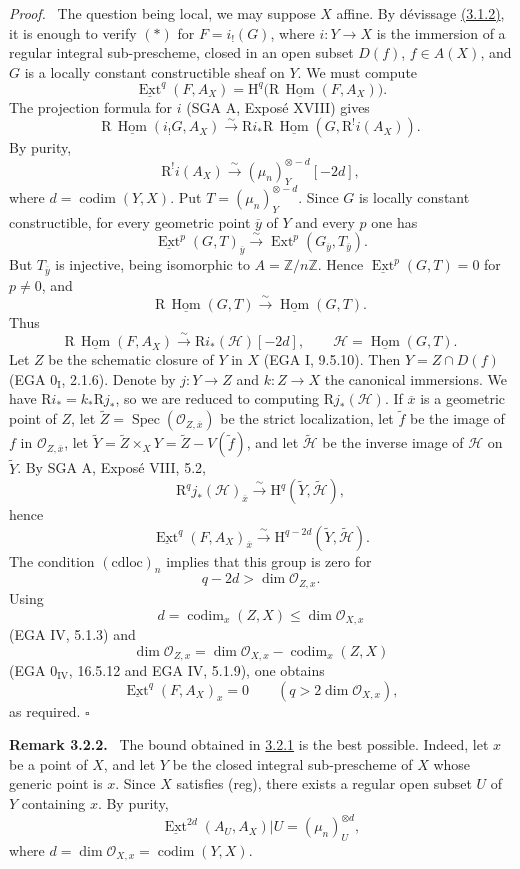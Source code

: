 \documentclass[11pt]{article}
\DeclareMathOperator{\codim}{codim}
\providecommand{\cO}{\mathcal{O}}
\providecommand{\wt}[1]{\widetilde{#1}}
\providecommand{\Hh}{\mathrm{H}}
\providecommand{\uExt}{\underline{\Ext}}
\providecommand{\qedtext}{\hfill$\square$}
\providecommand{\ZZ}{\mathbb{Z}}
\newenvironment{statement}[1]{\par\medskip\noindent\textbf{#1.}\ }{\par\medskip}
\newenvironment{prooftext}[1][Proof]{\par\noindent\emph{#1.}\ }{\par\medskip}
\DeclareMathOperator{\Hom}{Hom}
\DeclareMathOperator{\Ext}{Ext}
\DeclareMathOperator{\Spec}{Spec}
\newcommand{\R}{\mathrm{R}}
\newcommand{\ol}[1]{\overline{#1}}
\providecommand{\Hom}{\operatorname{Hom}}
\providecommand{\R}{\mathrm R}
\providecommand{\Spec}{\operatorname{Spec}}
\providecommand{\Spec}{\operatorname{Spec}}
\providecommand{\Hom}{\operatorname{Hom}}
\providecommand{\Spec}{\operatorname{Spec}}
\providecommand{\qedtext}{\hfill$\square$}
\providecommand{\Spec}{\operatorname{Spec}}
\begin{document}
\begin{prooftext}
The question being local, we may suppose $X$ affine. By dévissage \hyperref[sga5:I:statement:3.1.2]{(3.1.2)}, it is enough to verify $(*)$ for $F=i_!(G)$, where $i:Y\to X$ is the immersion of a regular integral sub-prescheme, closed in an open subset $D(f)$, $f\in A(X)$, and $G$ is a locally constant constructible sheaf on $Y$. We must compute
\[
   \uExt^q(F,A_X)=\Hh^q\bigl(\R\,\underline{\Hom}(F,A_X)\bigr).
\]
The projection formula for $i$ (SGA A, Exposé XVIII) gives
\[
 \R\,\underline{\Hom}(i_!G,A_X)
   \xrightarrow{\sim}
 \R i_*\R\,\underline{\Hom}(G,\R^!i(A_X)).
\]
By purity,
\[
   \R^!i(A_X)\xrightarrow{\sim}(\mu_n)^{\otimes -d}_Y[-2d],
\]
where $d=\codim(Y,X)$. Put $T=(\mu_n)^{\otimes -d}_Y$. Since $G$ is locally constant constructible, for every geometric point $\ol y$ of $Y$ and every $p$ one has
\[
   \uExt^p(G,T)_{\ol y}\xrightarrow{\sim}\Ext^p(G_{\ol y},T_{\ol y}).
\]
But $T_{\ol y}$ is injective, being isomorphic to $A=\ZZ/n\ZZ$. Hence $\uExt^p(G,T)=0$ for $p\ne0$, and
\[
   \R\,\underline{\Hom}(G,T)\xrightarrow{\sim}\underline{\Hom}(G,T).
\]
Thus
\[
   \R\,\underline{\Hom}(F,A_X)
      \xrightarrow{\sim} \R i_*(\mathcal H)[-2d],
   \qquad \mathcal H=\underline{\Hom}(G,T).
\]
Let $Z$ be the schematic closure of $Y$ in $X$ (EGA I, 9.5.10). Then $Y=Z\cap D(f)$ (EGA $0_{\mathrm I}$, 2.1.6). Denote by $j:Y\to Z$ and $k:Z\to X$ the canonical immersions. We have $\R i_*=k_*\R j_*$, so we are reduced to computing $\R j_*(\mathcal H)$. If $\ol x$ is a geometric point of $Z$, let $\wt Z=\Spec(\cO_{Z,\ol x})$ be the strict localization, let $\wt f$ be the image of $f$ in $\cO_{Z,\ol x}$, let $\wt Y=\wt Z\times_XY=\wt Z-V(\wt f)$, and let $\wt{\mathcal H}$ be the inverse image of $\mathcal H$ on $\wt Y$. By SGA A, Exposé VIII, 5.2,
\[
   \R^qj_*(\mathcal H)_{\ol x}
      \xrightarrow{\sim}\Hh^q(\wt Y,\wt{\mathcal H}),
\]
hence
\[
   \uExt^q(F,A_X)_{\ol x}
      \xrightarrow{\sim}\Hh^{q-2d}(\wt Y,\wt{\mathcal H}).
\]
The condition $(\mathrm{cdloc})_n$ implies that this group is zero for
\[
   q-2d>\dim\cO_{Z,x}.
\]
Using
\[
   d=\codim_x(Z,X)\le\dim\cO_{X,x}
\]
(EGA IV, 5.1.3) and
\[
   \dim\cO_{Z,x}
     =\dim\cO_{X,x}-\codim_x(Z,X)
\]
(EGA $0_{\mathrm{IV}}$, 16.5.12 and EGA IV, 5.1.9), one obtains
\[
   \uExt^q(F,A_X)_x=0\qquad(q>2\dim\cO_{X,x}),
\]
as required. \qedtext
\end{prooftext}

\label{sga5:I:remark:3.2.2}\begin{statement}{Remark 3.2.2}
The bound obtained in \hyperref[sga5:I:proposition:3.2.1]{3.2.1} is the best possible. Indeed, let $x$ be a point of $X$, and let $Y$ be the closed integral sub-prescheme of $X$ whose generic point is $x$. Since $X$ satisfies (reg), there exists a regular open subset $U$ of $Y$ containing $x$. By purity,
\[
   \uExt^{2d}(A_U,A_X)|U=(\mu_n)^{\otimes d}_U,
\]
where $d=\dim\cO_{X,x}=\codim(Y,X)$.
\end{statement}
\end{document}
